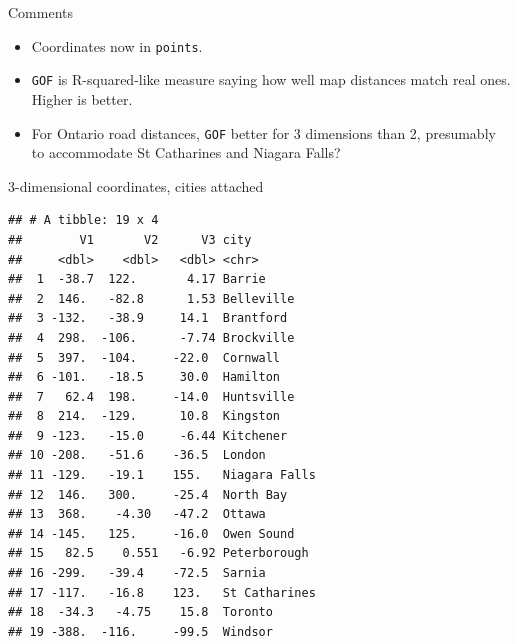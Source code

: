 \documentclass[ignorenonframetext,]{beamer}
\newenvironment{Shaded}{\begin{snugshade}}{\end{snugshade}}
\newcommand{\DataTypeTok}[1]{\textcolor[rgb]{0.13,0.29,0.53}{#1}}
\newcommand{\FloatTok}[1]{\textcolor[rgb]{0.00,0.00,0.81}{#1}}
\newcommand{\KeywordTok}[1]{\textcolor[rgb]{0.13,0.29,0.53}{\textbf{#1}}}
\newcommand{\NormalTok}[1]{#1}
\newcommand{\OperatorTok}[1]{\textcolor[rgb]{0.81,0.36,0.00}{\textbf{#1}}}
\newcommand{\StringTok}[1]{\textcolor[rgb]{0.31,0.60,0.02}{#1}}
\begin{document}
\begin{frame}[fragile]{Comments}
\protect\hypertarget{comments-20}{}

\begin{itemize}
\item
  Coordinates now in \texttt{points}.
\item
  \texttt{GOF} is R-squared-like measure saying how well map distances
  match real ones. Higher is better.
\item
  For Ontario road distances, \texttt{GOF} better for 3 dimensions than
  2, presumably to accommodate St Catharines and Niagara Falls?
\end{itemize}

\end{frame}

\begin{frame}[fragile]{3-dimensional coordinates, cities attached}
\protect\hypertarget{dimensional-coordinates-cities-attached}{}

\begin{Shaded}
\end{Shaded}

\begin{verbatim}
## # A tibble: 19 x 4
##        V1       V2      V3 city         
##     <dbl>    <dbl>   <dbl> <chr>        
##  1  -38.7  122.       4.17 Barrie       
##  2  146.   -82.8      1.53 Belleville   
##  3 -132.   -38.9     14.1  Brantford    
##  4  298.  -106.      -7.74 Brockville   
##  5  397.  -104.     -22.0  Cornwall     
##  6 -101.   -18.5     30.0  Hamilton     
##  7   62.4  198.     -14.0  Huntsville   
##  8  214.  -129.      10.8  Kingston     
##  9 -123.   -15.0     -6.44 Kitchener    
## 10 -208.   -51.6    -36.5  London       
## 11 -129.   -19.1    155.   Niagara Falls
## 12  146.   300.     -25.4  North Bay    
## 13  368.    -4.30   -47.2  Ottawa       
## 14 -145.   125.     -16.0  Owen Sound   
## 15   82.5    0.551   -6.92 Peterborough 
## 16 -299.   -39.4    -72.5  Sarnia       
## 17 -117.   -16.8    123.   St Catharines
## 18  -34.3   -4.75    15.8  Toronto      
## 19 -388.  -116.     -99.5  Windsor
\end{verbatim}

\end{frame}
\end{document}
